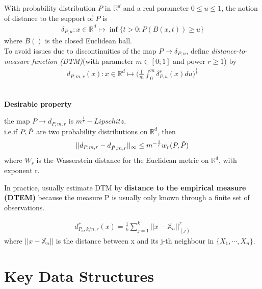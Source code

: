 \begin{definition}
With probability distribution $P$ in $\mathbb{R}^d$ and a real parameter $0 \leq u \leq 1$, the notion of distance to the support of $P$ is
\begin{align*}
    \delta_{P,u}:x \in \mathbb{R}^d \mapsto \inf\{t>0;P(B(x,t))  \geq u\}
\end{align*}
where $B()$ is the closed Euclidean ball.\\
To avoid issues due to discontinuities of the map $P \rightarrow \delta_{P,u}$, define \textit{distance-to-measure function (DTM)}(with parameter $m \in [0; 1]$ and power $r \geq 1$) by
\begin{align*}
    d_{P,m,r}(x): x \in \mathbb{R}^d \mapsto \bigg(\frac{1}{m}\int_0^m \delta_{P,u}^r(x)du\bigg)^{\frac{1}{r}}
\end{align*}
\end{definition}
\ \\
\textbf{Desirable property}
\begin{theorem}
the map $P \rightarrow d_{P,m,r}$ is $m^\frac{1}{r} - Lipschitz$.\\
i.e.if $P,\Tilde{P}$ are two probability distributions on $\mathbb{R}^d$, then
\begin{align*}
    ||d_{P,m,r}-d_{\Tilde{P},m,r}||_\infty \leq m^{-\frac{1}{r}}w_r(P,\Tilde{P})
\end{align*}
where $W_r$ is the Wasserstein distance for the Euclidean metric on $\mathbb{R}^d$, with exponent r.
\end{theorem}

In practice, usually estimate DTM by \textbf{distance to the
empirical measure (DTEM)} because the measure P is usually only known through a finite set of observations.

\begin{definition}
\begin{align*}
    d_{P_n,k/n,r}^r(x) = \frac{1}{k}\sum_{j=1}^k ||x -\mathbb{X}_n||_{(j)}^r
\end{align*}
where $||x -\mathbb{X}_n||$ is the distance between x and its j-th neighbour in $\{X_1,\cdots,X_n\}$.
\end{definition}

\section{Key Data Structures}

